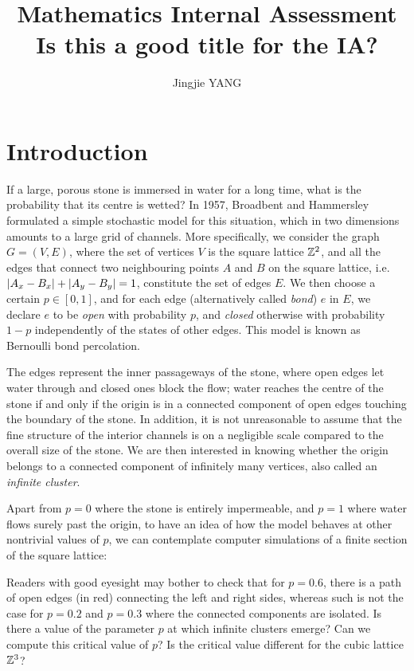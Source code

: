 \documentclass[a4paper, 12pt]{article}
\title{
\textbf{Mathematics Internal Assessment}\\
\bigskip
Is this a good title for the IA?
}
\author{Jingjie YANG}
\date{}
\begin{document}
\maketitle

\section{Introduction}
If a large, porous stone is immersed in water for a long time, what is the probability that its centre is wetted? In 1957, Broadbent and Hammersley \autocite*[693]{broadbent_hammersley_1957} formulated a simple stochastic model for this situation, which in two dimensions amounts to a large grid of channels. More specifically, we consider the graph $G = (V, E)$, where the set of vertices $V$ is the square lattice $\mathbb{Z}^2$, and all the edges that connect two neighbouring points $A$ and $B$ on the square lattice, i.e.\ $\lvert A_x - B_x \rvert + \lvert A_y - B_y \rvert = 1$, constitute the set of edges $E$. We then choose a certain $p \in [0, 1]$, and for each edge (alternatively called \textit{bond}) $e$ in $E$, we declare $e$ to be \textit{open} with probability $p$, and \textit{closed} otherwise with probability $1 - p$ independently of the states of other edges. This model is known as Bernoulli bond percolation.



The edges represent the inner passageways of the stone, where open edges let water through and closed ones block the flow; water reaches the centre of the stone if and only if the origin is in a connected component of open edges touching the boundary of the stone. In addition, it is not unreasonable to assume that the fine structure of the interior channels is on a negligible scale compared to the overall size of the stone. We are then interested in knowing whether the origin belongs to a connected component of infinitely many vertices, also called an \textit{infinite cluster}. 

Apart from $p = 0$ where the stone is entirely impermeable, and $p = 1$ where water flows surely past the origin, to have an idea of how the model behaves at other nontrivial values of $p$, we can contemplate computer simulations of a finite section of the square lattice:


\break 

Readers with good eyesight may bother to check that for $p = 0.6$, there is a path of open edges (in red) connecting the left and right sides, whereas such is not the case for $p = 0.2$ and $p = 0.3$ where the connected components are isolated. Is there a value of the parameter $p$ at which infinite clusters emerge? Can we compute this critical value of $p$? Is the critical value different for the cubic lattice $\mathbb{Z}^3$?
\end{document}
